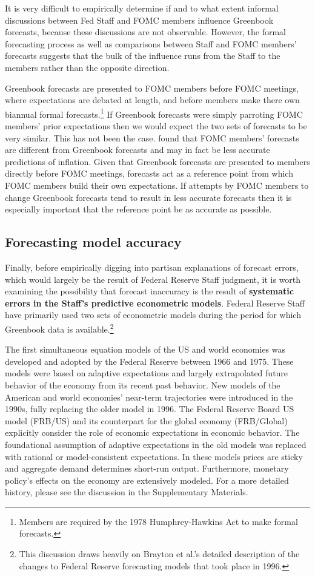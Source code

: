 \documentclass[a4paper]{article}\usepackage[]{graphicx}\usepackage[]{color}
\begin{document}
It is very difficult to empirically determine if and to what extent informal discussions between Fed Staff and FOMC members influence Greenbook forecasts, because these discussions are not observable. However, the formal forecasting process as well as comparisons between Staff and FOMC members' forecasts suggests that the bulk of the influence runs from the Staff to the members rather than the opposite direction.

Greenbook forecasts are presented to FOMC members before FOMC meetings, where expectations are debated at length, and before members make there own biannual formal forecasts.\footnote{Members are required by the 1978 Humphrey-Hawkins Act to make formal forecasts.} If Greenbook forecasts were simply parroting FOMC members' prior expectations then we would expect the two sets of forecasts to be very similar. This has not been the case. \cite{RomerRomer2008} found that FOMC members' forecasts are different from Greenbook forecasts and may in fact be less accurate predictions of inflation. Given that Greenbook forecasts are presented to members directly before FOMC meetings, forecasts act as a reference point from which FOMC members build their own expectations. If attempts by FOMC members to change Greenbook forecasts tend to result in less accurate forecasts then it is especially important that the reference point be as accurate as possible.

\subsection{Forecasting model accuracy}

Finally, before empirically digging into partisan explanations of forecast errors, which would largely be the result of Federal Reserve Staff judgment, it is worth examining the possibility that forecast inaccuracy is the result of \textbf{systematic errors in the Staff's predictive econometric models}. Federal Reserve Staff have primarily used two sets of econometric models during the period for which Greenbook data is available.\footnote{This discussion draws heavily on Brayton et al.'s \citeyear{Brayton1997} detailed description of the changes to Federal Reserve forecasting models that took place in 1996.} 

The first simultaneous equation models of the US and world economies was developed and adopted by the Federal Reserve between 1966 and 1975. These models were based on adaptive expectations and largely extrapolated future behavior of the economy from its recent past behavior. New models of the American and world economies' near-term trajectories were introduced in the 1990s, fully replacing the older model in 1996. The Federal Reserve Board US model (FRB/US) and its counterpart for the global economy (FRB/Global) explicitly consider the role of economic expectations in economic behavior. The foundational assumption of adaptive expectations in the old models was replaced with rational or model-consistent expectations. In these models prices are sticky and aggregate demand determines short-run output. Furthermore, monetary policy's effects on the economy are extensively modeled. For a more detailed history, please see the discussion in the Supplementary Materials.
\end{document}
